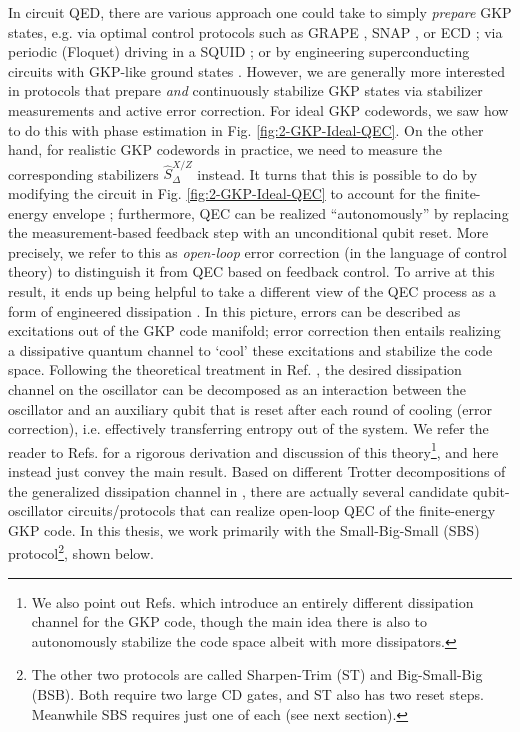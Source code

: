 In circuit QED, there are various approach one could take to simply \textit{prepare} GKP states, e.g. via optimal control protocols such as GRAPE \cite{khaneja2005grape, reinhold2019thesis}, SNAP \cite{krastanov2015-SNAP, heeres2015-SNAP, fosel2020-SNAP}, or ECD \cite{eickbusch2022fast}; via periodic (Floquet) driving in a SQUID \cite{gkp-periodic-drive2024}; or by engineering superconducting circuits with GKP-like ground states \cite{rymarz2021hardwaregkp}. However, we are generally more interested in protocols that prepare \textit{and} continuously stabilize GKP states via stabilizer measurements and active error correction. For ideal GKP codewords, we saw how to do this with phase estimation in Fig. \ref{fig:2-GKP-Ideal-QEC}. On the other hand, for realistic GKP codewords in practice, we need to measure the corresponding stabilizers $\hat{S}_\Delta^{X/Z}$ instead. It turns that this is possible to do by modifying the circuit in Fig. \ref{fig:2-GKP-Ideal-QEC} to account for the finite-energy envelope \cite{fluhmann2019gkp-expt, campagne2020gkp-expt, royer2020gkp, deneeve2022gkp-expt}; furthermore, QEC can be realized ``autonomously'' by replacing the measurement-based feedback step with an unconditional qubit reset. More precisely, we refer to this as \textit{open-loop} error correction (in the language of control theory) to distinguish it from QEC based on feedback control. To arrive at this result, it ends up being helpful to take a different view of the QEC process as a form of engineered dissipation \cite{royer2020gkp, vlad2023thesis}. In this picture, errors can be described as excitations out of the GKP code manifold; error correction then entails realizing a dissipative quantum channel to `cool' these excitations and stabilize the code space. Following the theoretical treatment in Ref. \cite{royer2020gkp}, the desired dissipation channel on the oscillator can be decomposed as an interaction between the oscillator and an auxiliary qubit that is reset after each round of cooling (error correction), i.e. effectively transferring entropy out of the system. We refer the reader to Refs. \cite{royer2020gkp, sivak2023gkp-expt, vlad2023thesis} for a rigorous derivation and discussion of this theory\footnote{We also point out Refs. \cite{sellem2023gkp, sellem2024gkp} which introduce an entirely different dissipation channel for the GKP code, though the main idea there is also to autonomously stabilize the code space albeit with more dissipators.}, and here instead just convey the main result. Based on different Trotter decompositions of the generalized dissipation channel in \cite{royer2020gkp}, there are actually several candidate qubit-oscillator circuits/protocols that can realize open-loop QEC of the finite-energy GKP code. In this thesis, we work primarily with the Small-Big-Small (SBS) protocol\footnote{The other two protocols are called Sharpen-Trim (ST) and Big-Small-Big (BSB). Both require two large CD gates, and ST also has two reset steps. Meanwhile SBS requires just one of each (see next section).}, shown below. 
